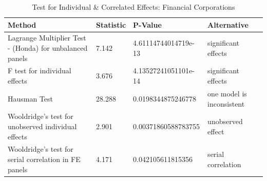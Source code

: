 \begin{table}[ht]
\centering
\caption{ Test for Individual & Correlated Effects: Financial Corporations} 
\begingroup\small
\begin{tabular}{llll}
  \toprule
Method & Statistic & P-Value & Alternative \\ 
  \midrule
Lagrange Multiplier Test -  (Honda) for unbalanced panels & 7.142 & 4.61114744014719e-13 & significant effects \\ 
  F test for individual effects & 3.676 & 4.13527241051101e-14 & significant effects \\ 
  Hausman Test & 28.288 & 0.0198344875246778 & one model is inconsistent \\ 
  Wooldridge's test for unobserved individual effects & 2.901 & 0.00371860588783755 & unobserved effect \\ 
  Wooldridge's test for serial correlation in FE panels & 4.171 & 0.042105611815356 & serial correlation \\ 
   \bottomrule
\end{tabular}
\endgroup
\end{table}
